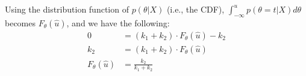Using the distribution function of $p(\theta|X)$ (i.e., the CDF), $\int_{-\infty}^{u} p(\theta=t|X) d\theta$ becomes $F_\theta(\hat{u})$, and we have the following:
\begin{align*}
    0 &= (k_1 + k_2)\cdot F_\theta(\hat{u}) - k_2\\
    k_2 &= (k_1 + k_2)\cdot F_\theta(\hat{u})\\
    F_\theta(\hat{u}) &= \frac{k_2}{k_1+k_2}
\end{align*}